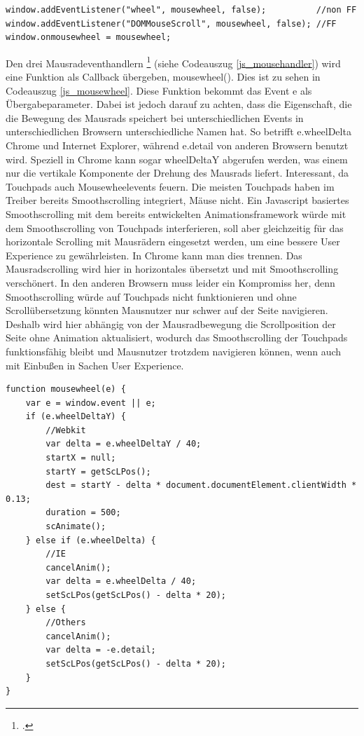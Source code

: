 \begin{lstlisting}[caption=Die unterschiedlichen Eventhandler des Mausrads., label=js_mousehandler]
window.addEventListener("wheel", mousewheel, false);          //non FF
window.addEventListener("DOMMouseScroll", mousewheel, false); //FF
window.onmousewheel = mousewheel;
\end{lstlisting} 

Den drei Mausradeventhandlern  \footcite[vgl.][]{jsMousewheel} (siehe Codeauszug \ref{js_mousehandler}) wird eine Funktion als Callback übergeben, mousewheel(). Dies ist zu sehen in Codeauszug \ref{js_mousewheel}. Diese Funktion bekommt das Event e als Übergabeparameter. Dabei ist jedoch darauf zu achten, dass die Eigenschaft, die die Bewegung des Mausrads speichert bei unterschiedlichen Events in unterschiedlichen Browsern unterschiedliche Namen hat. So betrifft e.wheelDelta Chrome und Internet Explorer, während e.detail von anderen Browsern benutzt wird. Speziell in Chrome kann sogar wheelDeltaY abgerufen werden, was einem nur die vertikale Komponente der Drehung des Mausrads liefert. Interessant, da Touchpads auch Mousewheelevents feuern. Die meisten Touchpads haben im Treiber bereits Smoothscrolling integriert, Mäuse nicht. Ein Javascript basiertes Smoothscrolling mit dem bereits entwickelten Animationsframework würde mit dem Smoothscrolling von Touchpads interferieren, soll aber gleichzeitig für das horizontale Scrolling mit Mausrädern eingesetzt werden, um eine bessere User Experience zu gewährleisten. In Chrome kann man dies trennen. Das Mausradscrolling wird hier in horizontales übersetzt und mit Smoothscrolling verschönert. In den anderen Browsern muss leider ein Kompromiss her, denn Smoothscrolling würde auf Touchpads nicht funktionieren und ohne Scrollübersetzung könnten Mausnutzer nur schwer auf der Seite navigieren. Deshalb wird hier abhängig von der Mausradbewegung die Scrollposition der Seite ohne Animation aktualisiert, wodurch das Smoothscrolling der Touchpads funktionsfähig bleibt und Mausnutzer trotzdem navigieren können, wenn auch mit Einbußen in Sachen User Experience.

 \begin{lstlisting}[caption=Die Funktion mousewheel() regelt die Verarbeitung des Mausraddelta., label=js_mousewheel]
function mousewheel(e) {
	var e = window.event || e;
	if (e.wheelDeltaY) {
		//Webkit
		var delta = e.wheelDeltaY / 40;
		startX = null;
		startY = getScLPos();
		dest = startY - delta * document.documentElement.clientWidth * 0.13;
		duration = 500;
		scAnimate();
	} else if (e.wheelDelta) {
		//IE
		cancelAnim();
		var delta = e.wheelDelta / 40;
		setScLPos(getScLPos() - delta * 20);
	} else {
		//Others
		cancelAnim();
		var delta = -e.detail;
		setScLPos(getScLPos() - delta * 20);
	}
}
\end{lstlisting} 

